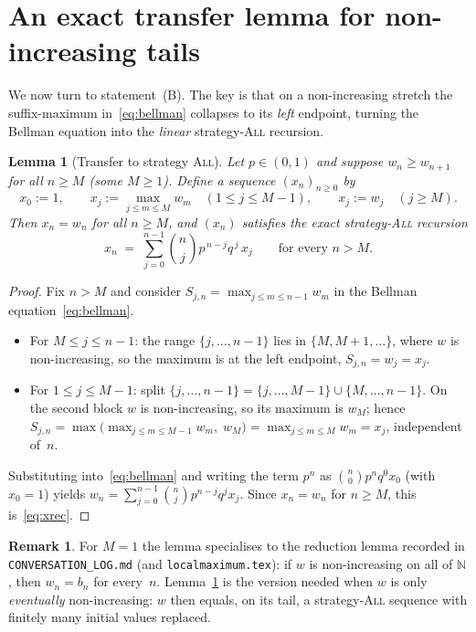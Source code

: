 \documentclass[11pt]{article}
\newtheorem{lemma}[theorem]{Lemma}
\theoremstyle{definition}
\newtheorem{remark}[theorem]{Remark}
\newcommand{\All}{\textsc{All}}
\newcommand{\N}{\mathbb{N}}
\begin{document}
\section{An exact transfer lemma for non-increasing
  tails}\label{sec:transfer}

We now turn to statement~(B). The key is that on a non-increasing
stretch the suffix-maximum in~\eqref{eq:bellman} collapses to its
\emph{left} endpoint, turning the Bellman equation into the
\emph{linear} strategy-\All{} recursion.

\begin{lemma}[Transfer to strategy \All]\label{lem:transfer}
  Let $p\in(0,1)$ and suppose $w_n\ge w_{n+1}$ for all $n\ge M$
  (some $M\ge 1$). Define a sequence $(x_n)_{n\ge 0}$ by
  \[
    x_0:=1,\qquad
    x_j:=\max_{j\le m\le M}w_m \quad (1\le j\le M-1),\qquad
    x_j:=w_j \quad (j\ge M).
  \]
  Then $x_n=w_n$ for all $n\ge M$, and $(x_n)$ satisfies the exact
  strategy-\All{} recursion
  \begin{equation}\label{eq:xrec}
    x_n \;=\; \sum_{j=0}^{n-1}\binom nj p^{\,n-j}q^{\,j}\,x_j
    \qquad\text{for every } n>M.
  \end{equation}
\end{lemma}

\begin{proof}
  Fix $n>M$ and consider $S_{j,n}=\max_{j\le m\le n-1}w_m$ in the
  Bellman equation~\eqref{eq:bellman}.
  \begin{itemize}[leftmargin=1.6em]
  \item For $M\le j\le n-1$: the range $\{j,\dots,n-1\}$ lies in
    $\{M,M+1,\dots\}$, where $w$ is non-increasing, so the maximum is
    at the left endpoint, $S_{j,n}=w_j=x_j$.
  \item For $1\le j\le M-1$: split
    $\{j,\dots,n-1\}=\{j,\dots,M-1\}\cup\{M,\dots,n-1\}$. On the second
    block $w$ is non-increasing, so its maximum is $w_M$; hence
    $S_{j,n}=\max\bigl(\max_{j\le m\le M-1}w_m,\;w_M\bigr)
    =\max_{j\le m\le M}w_m=x_j$, independent of~$n$.
  \end{itemize}
  Substituting into~\eqref{eq:bellman} and writing the term $p^n$ as
  $\binom n0 p^n q^0 x_0$ (with $x_0=1$) yields
  $w_n=\sum_{j=0}^{n-1}\binom nj p^{n-j}q^j x_j$. Since $x_n=w_n$ for
  $n\ge M$, this is~\eqref{eq:xrec}.
\end{proof}

\begin{remark}
  For $M=1$ the lemma specialises to the reduction lemma recorded in
  \texttt{CONVERSATION\_LOG.md} (and \texttt{localmaximum.tex}): if
  $w$ is non-increasing on all of $\N$, then $w_n=b_n$ for every~$n$.
  Lemma~\ref{lem:transfer} is the version needed when $w$ is only
  \emph{eventually} non-increasing: $w$ then equals, on its tail, a
  strategy-\All{} sequence with finitely many initial values replaced.
\end{remark}
\end{document}

